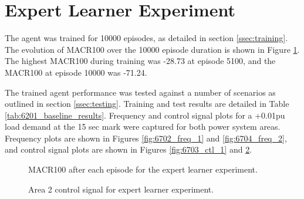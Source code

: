 \section{Expert Learner Experiment}
The agent was trained for 10000 episodes, as detailed in section \ref{ssec:training}. The evolution of MACR100 over the 10000 episode duration is shown in Figure \ref{fig:6701_average_reward}. The highest MACR100 during training was -28.73 at episode 5100, and the MACR100 at episode 10000 was -71.24.

The trained agent performance was tested against a number of scenarios as outlined in section \ref{ssec:testing}. Training and test results are detailed in Table \ref{tab:6201_baseline_results}. Frequency and control signal plots for a +0.01pu load demand at the 15 sec mark were captured for both power system areas. Frequency plots are shown in Figures \ref{fig:6702_freq_1} and \ref{fig:6704_freq_2}, and control signal plots are shown in Figures \ref{fig:6703_ctl_1} and \ref{fig:6705_ctl_2}.

\vspace{2cm}

\begin{figure}[h]
	\centering
	
	\caption{MACR100 after each episode for the expert learner experiment.}\label{fig:6701_average_reward}
\end{figure}



\begin{figure}[h]
	\centering
	
	
	\vspace{-0.5cm}
	\caption{Area 1 frequency response for expert learner experiment.}\label{fig:6702_freq_1}
	
	\vspace{0.5cm}
	
	
	\vspace{-0.5cm}
	\caption{Area 1 control signal for expert learner experiment.}\label{fig:6703_ctl_1}
	
	\vspace{0.5cm}
	
	
	\vspace{-0.5cm}
	\caption{Area 2 frequency response for expert learner experiment.}\label{fig:6704_freq_2}
	
	\vspace{0.5cm}
				
	
	\vspace{-0.5cm}
	\caption{Area 2 control signal for expert learner experiment.}\label{fig:6705_ctl_2}
\end{figure}